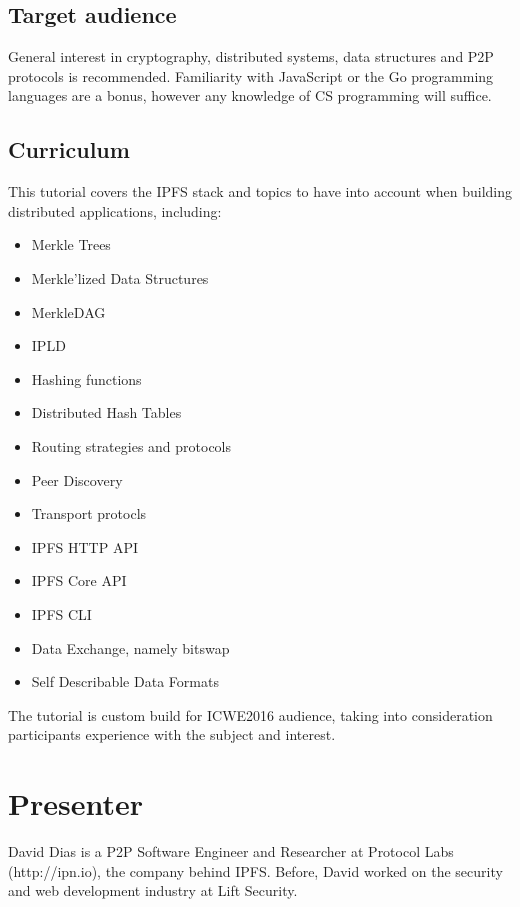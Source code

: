 \documentclass[runningheads,a4paper]{llncs}
\begin{document}
\subsection{Target audience}

General interest in cryptography, distributed systems, data structures and P2P protocols is recommended. Familiarity with JavaScript or the Go programming languages are a bonus, however any knowledge of CS programming will suffice.

\subsection{Curriculum}

This tutorial covers the IPFS stack and topics to have into account when building distributed applications, including:

\begin{itemize}
  \item Merkle Trees
  \item Merkle'lized Data Structures
  \item MerkleDAG
  \item IPLD
  \item Hashing functions
  \item Distributed Hash Tables
  \item Routing strategies and protocols
  \item Peer Discovery
  \item Transport protocls
  \item IPFS HTTP API
  \item IPFS Core API
  \item IPFS CLI
  \item Data Exchange, namely bitswap
  \item Self Describable Data Formats
\end{itemize}

The tutorial is custom build for ICWE2016 audience, taking into consideration participants experience with the subject and interest.


\section{Presenter}\label{sec:presenter}

David Dias is a P2P Software Engineer and Researcher at Protocol Labs (http://ipn.io), the company behind IPFS\@. Before, David worked on the security and web development industry at Lift Security.
\end{document}
